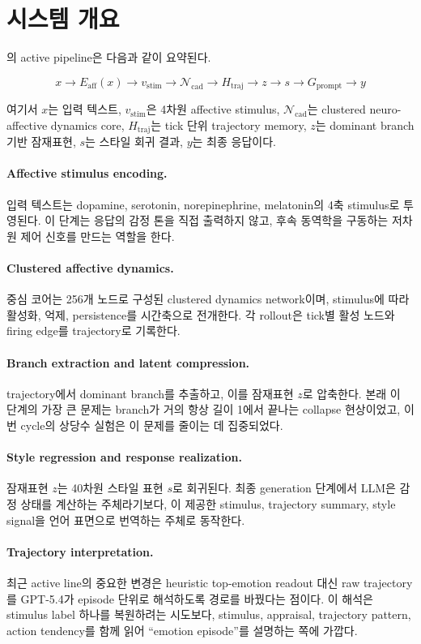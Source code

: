 \section{시스템 개요}

\EmoNet{}의 active pipeline은 다음과 같이 요약된다.

\begin{equation}
x \rightarrow E_{\mathrm{aff}}(x) \rightarrow v_{\mathrm{stim}}
\rightarrow \mathcal{N}_{\mathrm{cad}} \rightarrow H_{\mathrm{traj}}
\rightarrow z \rightarrow s \rightarrow G_{\mathrm{prompt}} \rightarrow y
\end{equation}

여기서 $x$는 입력 텍스트, $v_{\mathrm{stim}}$은 4차원 affective stimulus, $\mathcal{N}_{\mathrm{cad}}$는 clustered neuro-affective dynamics core, $H_{\mathrm{traj}}$는 tick 단위 trajectory memory, $z$는 dominant branch 기반 잠재표현, $s$는 스타일 회귀 결과, $y$는 최종 응답이다.

\paragraph{Affective stimulus encoding.}
입력 텍스트는 dopamine, serotonin, norepinephrine, melatonin의 4축 stimulus로 투영된다. 이 단계는 응답의 감정 톤을 직접 출력하지 않고, 후속 동역학을 구동하는 저차원 제어 신호를 만드는 역할을 한다.

\paragraph{Clustered affective dynamics.}
중심 코어는 256개 노드로 구성된 clustered dynamics network이며, stimulus에 따라 활성화, 억제, persistence를 시간축으로 전개한다. 각 rollout은 tick별 활성 노드와 firing edge를 trajectory로 기록한다.

\paragraph{Branch extraction and latent compression.}
trajectory에서 dominant branch를 추출하고, 이를 잠재표현 $z$로 압축한다. 본래 이 단계의 가장 큰 문제는 branch가 거의 항상 길이 1에서 끝나는 collapse 현상이었고, 이번 cycle의 상당수 실험은 이 문제를 줄이는 데 집중되었다.

\paragraph{Style regression and response realization.}
잠재표현 $z$는 40차원 스타일 표현 $s$로 회귀된다. 최종 generation 단계에서 LLM은 감정 상태를 계산하는 주체라기보다, \EmoNet{}이 제공한 stimulus, trajectory summary, style signal을 언어 표면으로 번역하는 주체로 동작한다.

\paragraph{Trajectory interpretation.}
최근 active line의 중요한 변경은 heuristic top-emotion readout 대신 raw trajectory를 GPT-5.4가 episode 단위로 해석하도록 경로를 바꿨다는 점이다. 이 해석은 stimulus label 하나를 복원하려는 시도보다, stimulus, appraisal, trajectory pattern, action tendency를 함께 읽어 ``emotion episode''를 설명하는 쪽에 가깝다.
